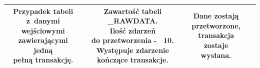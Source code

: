 \documentclass[a4paper]{book}
\begin{document}
\begin{table}
\begin{tabular}{|c|c|c|c|}
		\hline
		\makecell{Przypadek tabeli\\z~danymi wejściowymi\\zawierającymi jedną\\pełną transakcję.} & \makecell{Zawartość tabeli \_RAWDATA. \\Ilość zdarzeń\\do przetworzenia -~ 10.\\Występuje zdarzenie\\ kończące transakcje.}  & \makecell{Dane zostają\\przetworzone,\\transakcja zostaje\\wysłana.} & \makecell{Poprawny}\\
		\hline 
	\end{tabular}
	\label{tab:testy_preparser}
\end{table}
\end{document}
